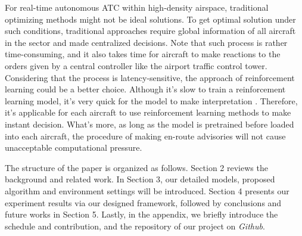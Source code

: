For real-time autonomous ATC within high-density airspace, traditional optimizing methods might not be ideal solutions. To get optimal solution under such conditions, traditional approaches require global information of all aircraft in the sector and made centralized decisions\citep{farley2007fast}. Note that such process is rather time-consuming, and it also takes time for aircraft to make reactions to the orders given by a central controller like the airport traffic control tower. Considering that the process is latency-sensitive, the approach of reinforcement learning could be a better choice. Although it's slow to train a reinforcement learning model, it's very quick for the model to make interpretation \citep{brittain2019autonomous}. Therefore, it's applicable for each aircraft to use reinforcement learning methods to make instant decision. What's more, as long as the model is pretrained before loaded into each aircraft, the procedure of making en-route advisories will not cause unacceptable computational pressure.

The structure of the paper is organized as follows. Section 2 reviews the background and  related work. In Section 3, our detailed models, proposed algorithm and environment settings will be introduced. Section 4 presents our experiment results via our designed framework, followed by conclusions and future works in Section 5. Lastly, in the appendix, we briefly introduce the schedule and contribution, and the repository of our project on \emph{Github}.